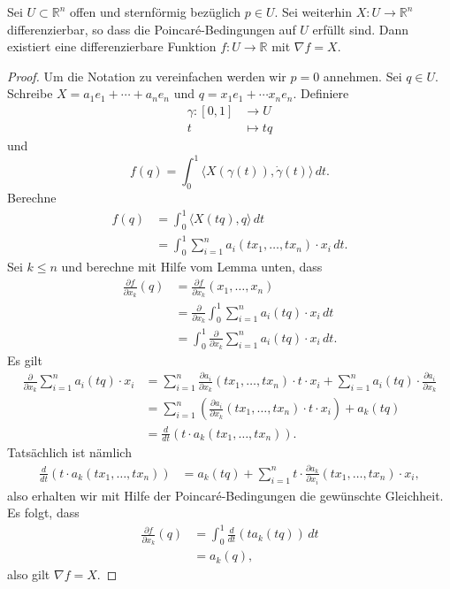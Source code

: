 \documentclass[../main.tex]{subfiles}
\begin{document}
\begin{theorem}
  Sei $U \subset \mathbb{R}^n$ offen und sternförmig bezüglich
  $p \in U$. Sei weiterhin $X \colon U \to \mathbb{R}^n$
  differenzierbar, so dass die Poincaré-Bedingungen
  auf $U$ erfüllt sind.
  Dann existiert eine differenzierbare Funktion
  $f \colon U \to \mathbb{R}$ mit $\nabla f = X$.
\end{theorem}

\begin{proof}
  Um die Notation zu vereinfachen werden wir $p = 0$ annehmen.
  Sei $q \in U$.
  Schreibe $X = a_1 e_1 + \cdots + a_n e_n$ und
  $q = x_1 e_1 + \cdots x_n e_n$.
  Definiere
  \begin{align*}
    \gamma \colon [0, 1] & \to U \\
    t & \mapsto tq
  \end{align*}
  und
  \[
    f(q) = \int_{0}^{1} \langle X(\gamma(t)),
    \dot \gamma (t) \rangle \, dt.
  \]
  Berechne
  \begin{align*}
    f(q)
    & = \int_{0}^{1} \langle X(tq), q \rangle \, dt\\
    &= \int_{0}^{1} \sum_{i=1}^{n} a_i(tx_1, \dots, tx_n) \cdot x_i \, dt.
  \end{align*}
  Sei $k \leq n$ und berechne mit Hilfe vom Lemma unten, dass
  \begin{align*}
    \frac{\partial f}{\partial x_k}(q)
    & = \frac{\partial f}{\partial x_k } (x_1, \dots, x_n)\\
    &= \frac{\partial}{\partial x_k} \int_{0}^{1}
    \sum_{i=1}^{n} a_i (tq) \cdot x_i \, dt \\
    &= \int_{0}^{1} \frac{\partial}{\partial x_k}
    \sum_{i=1}^{n} a_i(tq) \cdot x_i \, dt.
  \end{align*}
  Es gilt
  \begin{align*}
    \frac{\partial}{\partial x_k}
    \sum_{i=1}^{n} a_i(tq) \cdot x_i
    &= \sum_{i=1}^{n} \frac{\partial a_i}{\partial x_k}
    (tx_1, \dots, tx_n) \cdot t \cdot x_i
    + \sum_{i=1}^{n} a_i(tq) \cdot \frac{\partial a_i}{\partial x_k}\\
    &= \sum_{i=1}^{n} \left( \frac{\partial a_i}{\partial x_k}
    (tx_1, \dots, tx_n) \cdot t \cdot x_i \right)
    + a_k(tq) \\
    &= \frac{d}{dt} (t \cdot a_k(tx_1, \dots, tx_n)).
  \end{align*}
  Tatsächlich ist nämlich
  \begin{align*}
    \frac{d}{dt}(t \cdot a_k(tx_1, \dots, tx_n))
    & = a_k(tq) + \sum_{i=1}^{n} t \cdot \frac{\partial a_k}{\partial x_i}
    (tx_1, \dots, tx_n) \cdot x_i,
  \end{align*}
  also erhalten wir mit Hilfe der Poincaré-Bedingungen
  die gewünschte Gleichheit.
  Es folgt, dass
  \begin{align*}
    \frac{\partial f}{\partial x_k}(q)
    & = \int_{0}^{1} \frac{d}{dt}(t a_k (tq)) \, dt\\
    &= a_k(q),
  \end{align*}
  also gilt $\nabla f = X$.
\end{proof}
\end{document}
